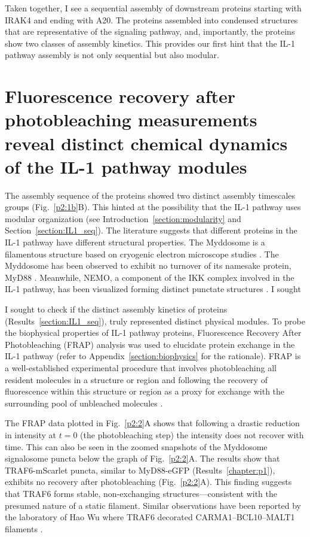 Taken together, I see a sequential assembly of downstream proteins starting with IRAK4 and ending with A20. The proteins assembled into condensed structures that are representative of the signaling pathway, and, importantly, the proteins show two classes of assembly kinetics. This provides our first hint that the IL-1 pathway assembly is not only sequential but also modular.

\section{Fluorescence recovery after photobleaching measurements reveal distinct chemical dynamics of the IL-1 pathway modules}
\label{section:biophysical}
The assembly sequence of the proteins showed two distinct assembly timescales groups (Fig.~\ref{p2:1b}B). This hinted at the possibility that the IL-1 pathway uses modular organization (see Introduction~\ref{section:modularity} and Section~\ref{section:IL1_seq}). The literature suggests that different proteins in the IL-1 pathway have different structural properties. The Myddosome is a filamentous structure based on cryogenic electron microscope studies \autocite{Moncrieffe_2020}. The Myddosome has been observed to exhibit no turnover of its namesake protein, MyD88 \autocite{Deliz-Aguirre_2021}. Meanwhile, NEMO, a component of the IKK complex involved in the IL-1 pathway, has been visualized forming distinct punctate structures \autocite{Tarantino_2014}. I sought 

I sought to check if the distinct assembly kinetics of proteins (Results~\ref{section:IL1_seq}), truly represented distinct physical modules. To probe the biophysical properties of IL-1 pathway proteins, Fluorescence Recovery After Photobleaching (FRAP) analysis was used to elucidate protein exchange in the IL-1 pathway (refer to Appendix~\ref{section:biophysics} for the rationale). FRAP is a well-established experimental procedure that involves photobleaching all resident molecules in a structure or region and following the recovery of fluorescence within this structure or region as a proxy for exchange with the surrounding pool of unbleached molecules \autocite{Alberti_2019}.

The FRAP data plotted in Fig.~\ref{p2:2}A shows that following a drastic reduction in intensity at $t = 0$ (the photobleaching step) the intensity does not recover with time. This can also be seen in the zoomed snapshots of the Myddosome signalosome puncta below the graph of Fig.~\ref{p2:2}A. The results show that TRAF6-mScarlet puncta, similar to MyD88-eGFP (Results~\ref{chapter:p1}), exhibits no recovery after photobleaching (Fig.~\ref{p2:2}A). This finding suggests that TRAF6 forms stable, non-exchanging structures---consistent with the presumed nature of a static filament. Similar observations have been reported by the laboratory of Hao Wu where TRAF6 decorated CARMA1--BCL10--MALT1 filaments \autocite{David_2018}.

